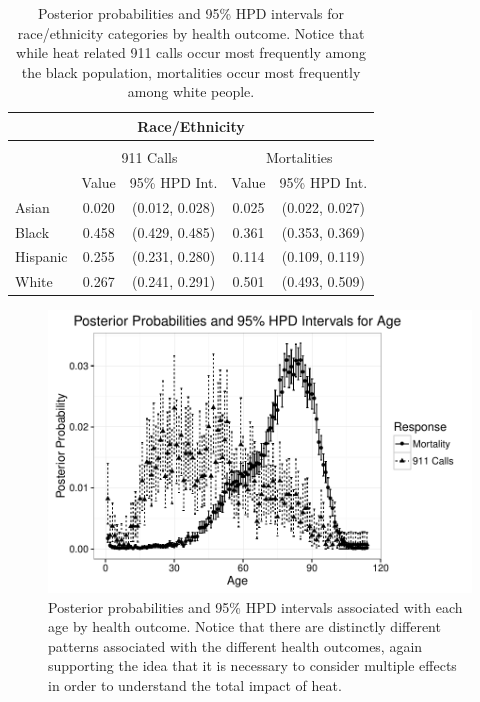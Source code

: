 \documentclass[final]{statsoc}
\begin{document}
\begin{table}
  \caption{Posterior probabilities and 95\% HPD intervals for race/ethnicity categories by health outcome. Notice that while heat related 911 calls occur most frequently among the black population, mortalities occur most frequently among white people.}
  \label{ethnicitytab}
  \centering
    \begin{tabular}{@{\extracolsep{5pt}} lcccc}\\[-1.8ex]
    \multicolumn{5}{c}{Race/Ethnicity} \\
    \hline \hline \\[-1.8ex]
    & \multicolumn{2}{c}{911 Calls} & \multicolumn{2}{c}{Mortalities} \\
    \hline
    & Value & 95\% HPD Int. & Value & 95\% HPD Int. \\
    \hline
    Asian & 0.020 & (0.012, 0.028) & 0.025 & (0.022, 0.027) \\
    Black & 0.458 & (0.429, 0.485) & 0.361 & (0.353, 0.369) \\
    Hispanic & 0.255 & (0.231, 0.280) & 0.114 & (0.109, 0.119) \\
    White & 0.267 & (0.241, 0.291) & 0.501 & (0.493, 0.509) \\
    \hline    
    \end{tabular}
\end{table} 


\begin{figure}
    \centering
    \includegraphics[width=1.0\textwidth]{imgs/age_probability.pdf}
    \caption{Posterior probabilities and 95\% HPD intervals associated with each age by health outcome. Notice that there are distinctly different patterns associated with the different health outcomes, again supporting the idea that it is necessary to consider multiple effects in order to understand the total impact of heat.}
    \label{pp-age}
\end{figure}
\end{document}
